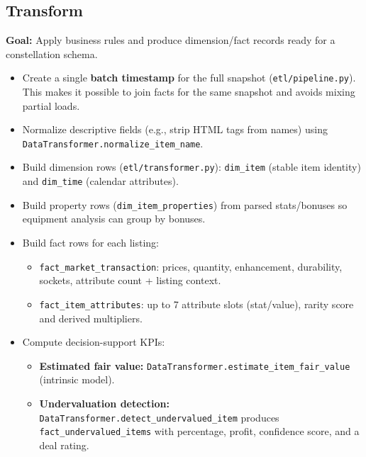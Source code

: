 \subsection{Transform}
\textbf{Goal:} Apply business rules and produce dimension/fact records ready for a constellation schema.
\begin{itemize}
  \item Create a single \textbf{batch timestamp} for the full snapshot (\texttt{etl/pipeline.py}).
  This makes it possible to join facts for the same snapshot and avoids mixing partial loads.
  \item Normalize descriptive fields (e.g., strip HTML tags from names) using \texttt{DataTransformer.normalize\_item\_name}.
  \item Build dimension rows (\texttt{etl/transformer.py}):
  	\texttt{dim\_item} (stable item identity) and \texttt{dim\_time} (calendar attributes).
  \item Build property rows (\texttt{dim\_item\_properties}) from parsed stats/bonuses so equipment analysis can group by bonuses.
  \item Build fact rows for each listing:
  \begin{itemize}
    \item \texttt{fact\_market\_transaction}: prices, quantity, enhancement, durability, sockets, attribute count + listing context.
    \item \texttt{fact\_item\_attributes}: up to 7 attribute slots (stat/value), rarity score and derived multipliers.
  \end{itemize}
  \item Compute decision-support KPIs:
  \begin{itemize}
    \item \textbf{Estimated fair value:} \texttt{DataTransformer.estimate\_item\_fair\_value} (intrinsic model).
    \item \textbf{Undervaluation detection:} \texttt{DataTransformer.detect\_undervalued\_item} produces \texttt{fact\_undervalued\_items}
    with percentage, profit, confidence score, and a deal rating.
  \end{itemize}
\end{itemize}

